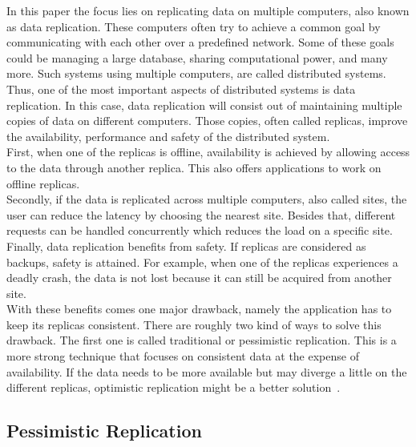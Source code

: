 \documentclass[a4paper,12pt]{report}
\begin{document}
In this paper the focus lies on replicating data on multiple computers, also known as data replication. These computers often try to achieve a common goal by communicating with each other over a predefined network. Some of these goals could be managing a large database, sharing computational power, and many more. Such systems using multiple computers, are called distributed systems.
Thus, one of the most important aspects of distributed systems is data replication. In this case, data replication will consist out of maintaining multiple copies of data on different computers. Those copies, often called replicas, improve the availability, performance and safety of the distributed system. \\
First, when one of the replicas is offline, availability is achieved by allowing access to the data through another replica. This also offers applications to work on offline replicas.\\
Secondly, if the data is replicated across multiple computers, also called sites, the user can reduce the latency by choosing the nearest site. Besides that, different requests can be handled concurrently which reduces the load on a specific site. \\
Finally, data replication benefits from safety. If replicas are considered as backups, safety is attained. For example, when one of the replicas experiences a deadly crash, the data is not lost because it can still be acquired from another site.\\
\newline
With these benefits comes one major drawback, namely the application has to keep its replicas consistent. There are roughly two kind of ways to solve this drawback. The first one is called traditional or pessimistic replication. This is a more strong technique that focuses on consistent data at the expense of availability. If the data needs to be more available but may diverge a little on the different replicas, optimistic replication might be a better solution~\cite{Saito}.

\subsection{Pessimistic Replication}\label{sec:PessimisticReplication}
\end{document}
